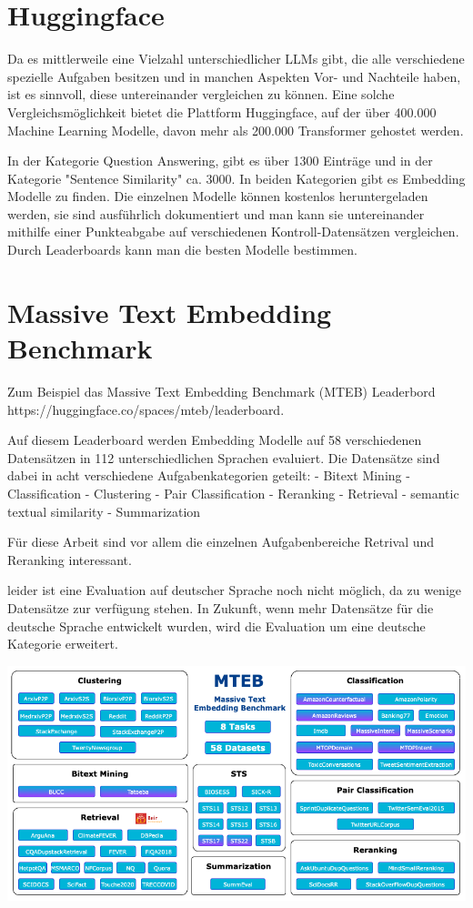 \section{Huggingface}

Da es mittlerweile eine Vielzahl unterschiedlicher LLMs gibt, die alle verschiedene spezielle Aufgaben besitzen und in manchen Aspekten Vor- und Nachteile haben, ist es sinnvoll, diese untereinander vergleichen zu können.
Eine solche Vergleichsmöglichkeit bietet die Plattform Huggingface, auf der über 400.000 Machine Learning Modelle, davon mehr als 200.000 Transformer gehostet werden.

In der Kategorie Question Answering, gibt es über 1300 Einträge und in der Kategorie "Sentence Similarity" ca. 3000.
In beiden Kategorien gibt es Embedding Modelle zu finden.
Die einzelnen Modelle können  kostenlos heruntergeladen werden, sie sind ausführlich dokumentiert und man kann sie untereinander mithilfe einer Punkteabgabe auf verschiedenen Kontroll-Datensätzen vergleichen.
Durch Leaderboards kann man die besten Modelle bestimmen.

\section{Massive Text Embedding Benchmark}

Zum Beispiel das Massive Text Embedding Benchmark (MTEB) Leaderbord https://huggingface.co/spaces/mteb/leaderboard.

Auf diesem Leaderboard werden Embedding Modelle  auf 58 verschiedenen Datensätzen in 112 unterschiedlichen Sprachen evaluiert.
Die Datensätze sind dabei in acht verschiedene Aufgabenkategorien geteilt:
- Bitext Mining
- Classification
- Clustering
- Pair Classification
- Reranking
- Retrieval
- semantic textual similarity
- Summarization

Für diese Arbeit sind vor allem die einzelnen Aufgabenbereiche Retrival und Reranking interessant.
\cite{muennighoff2023}

leider ist eine Evaluation auf deutscher Sprache noch nicht möglich, da zu wenige Datensätze zur verfügung stehen. 
In Zukunft, wenn mehr Datensätze für die deutsche Sprache entwickelt wurden, wird die Evaluation um eine deutsche Kategorie erweitert. \cite{muennighoff2023a}


\includegraphics[width=\linewidth]{figures/mteb.png}




